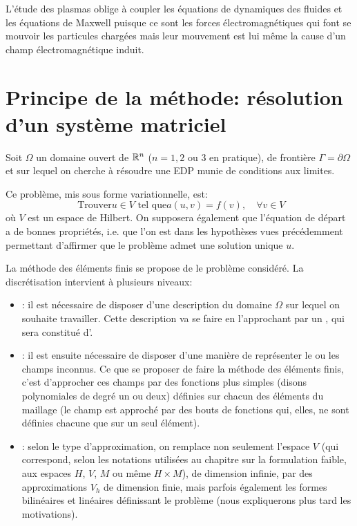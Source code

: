 L'étude des plasmas oblige à coupler les équations de dynamiques des fluides et les
équations de Maxwell puisque ce sont les forces électromagnétiques qui font se mouvoir
les particules chargées mais leur mouvement est lui même la cause d'un champ
électromagnétique induit.

\medskip
\section{Principe de la méthode: résolution d'un système matriciel}\label{Sec-mesh-carac}

Soit $\Omega$ un domaine ouvert de $\mathbb R^n$ ($n = 1, 2$ ou $3$ en pratique),
de frontière $\Gamma=\partial\Omega$ et sur lequel on cherche à résoudre une
EDP munie de conditions aux limites.

\medskip
Ce problème, mis sous forme variationnelle, est:
\begin{equation}\label{Eq-P}
\text{ Trouver} u\in V \text{ tel que} a(u,v) = f(v),\quad \forall v\in V
\end{equation}
où $V$ est un espace de Hilbert.
On supposera également que l'équation de départ a de bonnes propriétés,
i.e. que l'on est dans les hypothèses vues précédemment permettant d'affirmer
que le problème admet une solution unique $u$.

\medskip
La méthode des éléments finis se propose de  le problème considéré.
La discrétisation intervient à plusieurs niveaux:
\begin{itemize}
  \item {}:
	il est nécessaire de disposer d'une description du domaine $\Omega$ sur lequel
	on souhaite travailler. Cette description va se faire en l'approchant par
	un , qui sera constitué d'.
  \item {}:
	il est ensuite nécessaire de disposer d'une manière de représenter le ou
	les champs inconnus. Ce que se proposer de faire la méthode des éléments finis, c'est d'approcher
	ces champs par des fonctions plus simples (disons polynomiales de
	degré un ou deux) définies sur chacun des éléments du maillage
	(le champ est approché par des bouts de fonctions qui, elles, ne sont définies
	chacune que sur un seul élément).
  \item {}:
	selon le type d'approximation, on remplace non seulement l'espace $V$
	(qui correspond, selon les notations utilisées au chapitre sur la formulation faible, aux espaces
	$H$, $V$, $M$ ou même $H\times M$), de dimension infinie, par des approximations $V_h$
	de dimension finie, mais parfois également les formes bilinéaires et linéaires définissant
	le problème (nous expliquerons plus tard les motivations).
\end{itemize}

